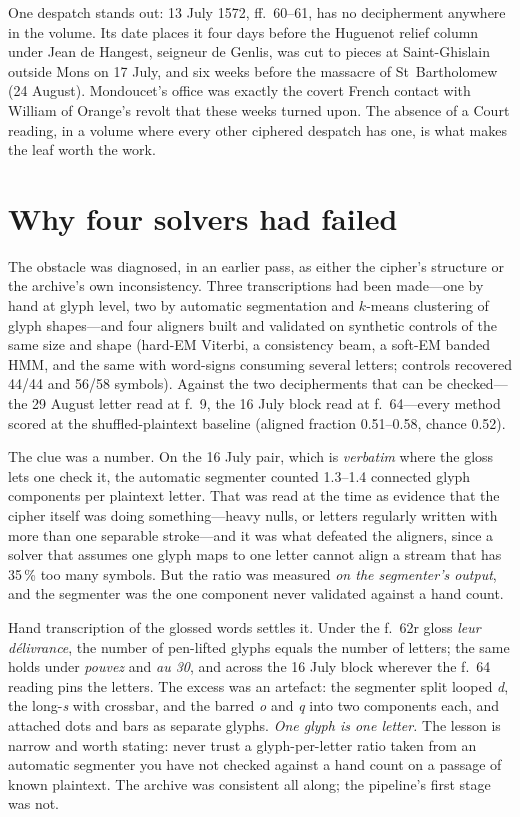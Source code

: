 \documentclass[11pt]{article}
\begin{document}
One despatch stands out: 13 July 1572, ff.~60--61, has no decipherment anywhere in the volume. Its date places it four days before the Huguenot relief column under Jean de Hangest, seigneur de Genlis, was cut to pieces at Saint-Ghislain outside Mons on 17 July, and six weeks before the massacre of St~Bartholomew (24 August). Mondoucet's office was exactly the covert French contact with William of Orange's revolt that these weeks turned upon. The absence of a Court reading, in a volume where every other ciphered despatch has one, is what makes the leaf worth the work.

\section{Why four solvers had failed}

The obstacle was diagnosed, in an earlier pass, as either the cipher's structure or the archive's own inconsistency. Three transcriptions had been made---one by hand at glyph level, two by automatic segmentation and $k$-means clustering of glyph shapes---and four aligners built and validated on synthetic controls of the same size and shape (hard-EM Viterbi, a consistency beam, a soft-EM banded HMM, and the same with word-signs consuming several letters; controls recovered 44/44 and 56/58 symbols). Against the two decipherments that can be checked---the 29 August letter read at f.~9, the 16 July block read at f.~64---every method scored at the shuffled-plaintext baseline (aligned fraction 0.51--0.58, chance 0.52).

The clue was a number. On the 16 July pair, which is \emph{verbatim} where the gloss lets one check it, the automatic segmenter counted 1.3--1.4 connected glyph components per plaintext letter. That was read at the time as evidence that the cipher itself was doing something---heavy nulls, or letters regularly written with more than one separable stroke---and it was what defeated the aligners, since a solver that assumes one glyph maps to one letter cannot align a stream that has 35\,\% too many symbols. But the ratio was measured \emph{on the segmenter's output}, and the segmenter was the one component never validated against a hand count.

Hand transcription of the glossed words settles it. Under the f.~62r gloss \emph{leur d\'elivrance}, the number of pen-lifted glyphs equals the number of letters; the same holds under \emph{pouvez} and \emph{au 30}, and across the 16 July block wherever the f.~64 reading pins the letters. The excess was an artefact: the segmenter split looped \emph{d}, the long-\emph{s} with crossbar, and the barred \emph{o} and \emph{q} into two components each, and attached dots and bars as separate glyphs. \emph{One glyph is one letter.} The lesson is narrow and worth stating: never trust a glyph-per-letter ratio taken from an automatic segmenter you have not checked against a hand count on a passage of known plaintext. The archive was consistent all along; the pipeline's first stage was not.
\end{document}
